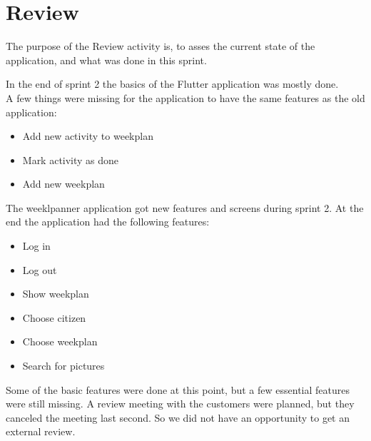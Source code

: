 \section{Review}

The purpose of the Review activity is, to asses the current state of the application, and what was done in this sprint.

In the end of sprint 2 the basics of the Flutter application was mostly done.\\
A few things were missing for the application to have the same features as the old application:
\begin{itemize}
    \item Add new activity to weekplan
    \item Mark activity as done
    \item Add new weekplan
\end{itemize}

The weeklpanner application got new features and screens during sprint 2. At the end the application had the following features:
\begin{itemize}
    \item Log in
    \item Log out
    \item Show weekplan 
    \item Choose citizen
    \item Choose weekplan
    \item Search for pictures
\end{itemize}

Some of the basic features were done at this point, but a few essential features were still missing. 
A review meeting with the customers were planned, but they canceled the meeting last second. So we did not have an opportunity  to get an external review.
